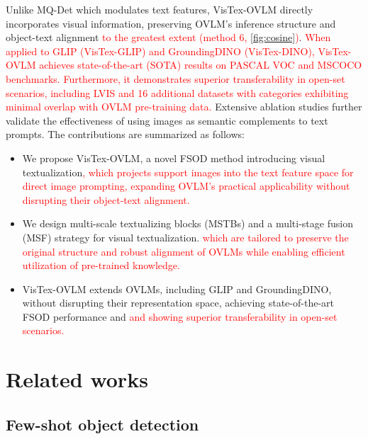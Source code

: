 \documentclass[10pt,twocolumn,letterpaper]{article}
\begin{document}
Unlike MQ-Det which modulates text features, VisTex-OVLM directly incorporates visual information, preserving OVLM’s inference structure and object-text alignment \textcolor{red}{to the greatest extent (method 6, \cref{fig:cosine})}. \textcolor{red}{When applied to GLIP (VisTex-GLIP) and GroundingDINO \cite{liu2023groundingdino} (VisTex-DINO), VisTex-OVLM achieves state-of-the-art (SOTA) results on PASCAL VOC \cite{everingham2010pascalvoc} and MSCOCO \cite{lin2014microsoftCOCO}  benchmarks. Furthermore, it demonstrates superior transferability in open-set scenarios, including LVIS \cite{gupta2019lvis} and 16 additional datasets with categories exhibiting minimal overlap with OVLM pre-training data.} Extensive ablation studies further validate the effectiveness of using images as semantic complements to text prompts. The contributions are summarized as follows:
\begin{itemize}
    \item We propose VisTex-OVLM, a novel FSOD method introducing visual textualization\textcolor{red}{, which projects support images into the text feature space for direct image prompting, expanding OVLM’s practical applicability without disrupting their object-text alignment.}
    \item We design multi-scale textualizing blocks (MSTBs) and a multi-stage fusion (MSF) strategy for visual textualization. \textcolor{red}{which are tailored to preserve the original structure and robust alignment of OVLMs while enabling efficient utilization of pre-trained knowledge.}
    \item VisTex-OVLM extends OVLMs, including GLIP and GroundingDINO, without disrupting their representation space, achieving state-of-the-art FSOD performance and \textcolor{red}{and showing superior transferability in open-set scenarios.} %
\end{itemize}


\section{Related works}
\subsection{Few-shot object detection}
\end{document}
